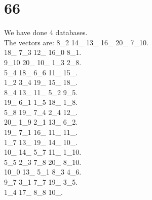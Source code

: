 \chapter{66}
\indent We have done 4 databases.\\
The vectors are:
8\_2 14\_ 13\_ 16\_ 20\_ 7\_10.\\18\_ 7\_3 12\_ 16\_0 8\_1.\\9\_10 20\_ 10\_ 1\_3 2\_8.\\5\_4 18\_ 6\_6 11\_ 15\_.\\1\_2 3\_4 19\_ 15\_ 18\_.\\8\_4 13\_ 11\_ 5\_2 9\_5.\\19\_ 6\_1 1\_5 18\_ 1\_8.\\5\_8 19\_ 7\_4 2\_4 12\_.\\20\_ 1\_9 2\_1 13\_ 6\_2.\\19\_ 7\_1 16\_ 11\_ 11\_.\\1\_7 13\_ 19\_ 14\_ 10\_.\\10\_ 14\_ 5\_7 11\_ 1\_10.\\5\_5 2\_3 7\_8 20\_ 8\_10.\\10\_0 13\_ 5\_1 8\_3 4\_6.\\9\_7 3\_1 7\_7 19\_ 3\_5.\\1\_4 17\_ 8\_8 10\_.\\